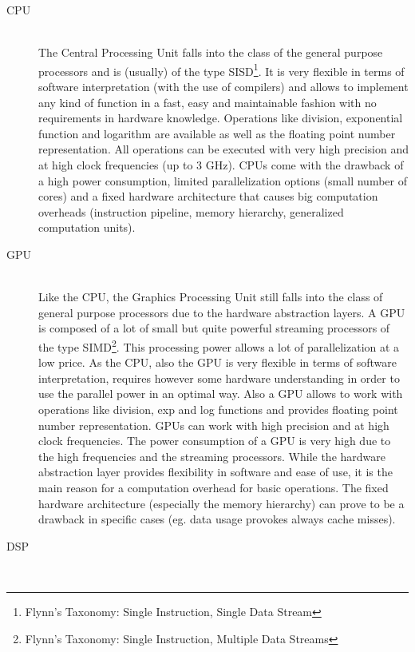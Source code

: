 \documentclass[mscthesis]{usiinfthesis}
\begin{document}
\begin{description}
    \item[CPU] \hfill \\
        The Central Processing Unit falls into the class of the general purpose
        processors and is (usually) of the type SISD\footnote{Flynn's Taxonomy:
        Single Instruction, Single Data Stream}. It is very flexible in terms
        of software interpretation (with the use of compilers) and allows to
        implement any kind of function in a fast, easy and maintainable
        fashion with no requirements in hardware knowledge.  Operations like
        division, exponential function and logarithm are available as well as
        the floating point number representation. All operations can be
        executed with very high precision and at high clock frequencies (up to
        3 GHz). CPUs come with the drawback of a high power consumption,
        limited parallelization options (small number of cores) and a fixed
        hardware architecture that causes big computation overheads
        (instruction pipeline, memory hierarchy, generalized computation
        units).
    \item[GPU] \hfill \\
        Like the CPU, the Graphics Processing Unit still falls into the class
        of general purpose processors due to the hardware abstraction layers.
        A GPU is composed of a lot of small but quite powerful streaming
        processors of the type SIMD\footnote{Flynn's Taxonomy: Single
        Instruction, Multiple Data Streams}. This processing power allows a lot
        of parallelization at a low price. As the CPU, also the GPU is very
        flexible in terms of software interpretation, requires however some
        hardware understanding in order to use the parallel power in an optimal
        way. Also a GPU allows to work with operations like division, exp and
        log functions and provides floating point number representation. GPUs
        can work with high precision and at high clock frequencies. The power
        consumption of a GPU is very high due to the high frequencies and the
        streaming processors. While the hardware abstraction layer provides
        flexibility in software and ease of use, it is the main reason for
        a computation overhead for basic operations. The fixed hardware
        architecture (especially the memory hierarchy) can prove to be
        a drawback in specific cases (eg. data usage provokes always cache
        misses).
    \item[DSP] \hfill \\

\end{description}
\end{document}
